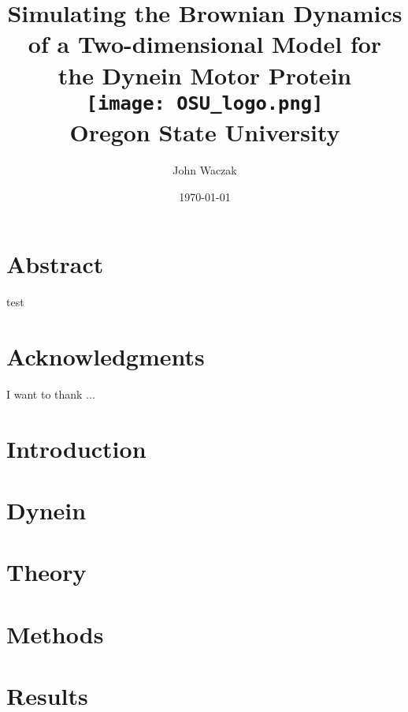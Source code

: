 \documentclass[12pt]{report}
\title{
	{Simulating the Brownian Dynamics of a Two-dimensional Model for the Dynein Motor Protein}\vspace{1.5em}\\
	\texttt{[image: OSU\_logo.png]}\vspace{0.5em}\\
	\large{Oregon State University}
}
\author{John Waczak}
\date{\today}
\begin{document}
	\onehalfspacing
	
	\maketitle
	
	\chapter*{Abstract}
	test
	\chapter*{Acknowledgments}
	I want to thank ...
	
	\tableofcontents
	
	\chapter{Introduction}
	
	\chapter{Dynein}
	
	\chapter{Theory}
	
	\chapter{Methods}
	
	\chapter{Results}
	


\end{document}
